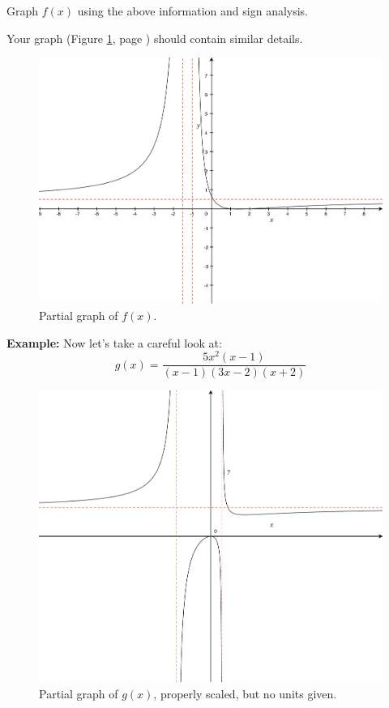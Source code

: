 \documentclass[12pt,addpoints, answers, fleqn]{exam}
\begin{document}
\begin{questions}
\item Graph $f\left( x \right)$ using the above information and sign analysis.
\begin{solution}
Your graph (Figure \ref{fig:graph0740}, page \pageref{fig:graph0740}) should contain similar details.
\end{solution}
\begin{figure}[htbp]
   \centering
   \includegraphics[width=.6\textwidth]{graphics/graph0740.pdf} 
   \caption{Partial graph of $f \left( x \right)$.}
   \label{fig:graph0740}
\end{figure}
\end{questions}



\textbf{Example:} Now let's take a careful look at:
\[
g\left( x \right) = \frac{5x^2\left(x-1\right)}{\left(x-1\right)\left(3x-2\right)\left(x+2\right)}
\]

\begin{figure}[htbp]
   \centering
   \includegraphics[width=.6\textwidth]{./graphics/graph0750.pdf} 
   \caption{Partial graph of $g \left( x \right)$, properly scaled, but no units given.}
   \label{fig:graph5007}
\end{figure}
\end{document}
